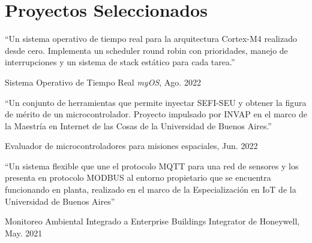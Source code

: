 \section{Proyectos Seleccionados}

\newcommand{\pub}[5]{
	\parbox[t][][t]{\linewidth}{%
		\begin{small}
		\parbox{\linewidth}{{``#4''}}
		\smallbreak
		\parbox{\linewidth}{{#2}, {#1}}
		\parbox{\linewidth}{{\href{https://doi.org/#3}{#3}}}
		\end{small}
	}
	\bigbreak
	\smallskip
}

\pub{Ago. 2022}{Sistema Operativo de Tiempo Real \emph{myOS}}{}{Un sistema operativo de tiempo real para la arquitectura Cortex-M4 realizado desde cero. Implementa un scheduler round robin con prioridades, manejo de interrupciones y un sistema de stack estático para cada tarea.}{
}

\pub{Jun. 2022}{Evaluador de microcontroladores para misiones espaciales}{}{Un conjunto de herramientas que permite inyectar SEFI-SEU y obtener la figura de mérito de un microcontrolador. Proyecto impulsado por INVAP en el marco de la Maestría en Internet de las Cosas de la Universidad de Buenos Aires.}{
}

\pub{May. 2021}{Monitoreo Ambiental Integrado a Enterprise Buildings Integrator de Honeywell}{}{Un sistema flexible que une el protocolo MQTT para una red de sensores y los presenta en protocolo MODBUS al entorno propietario que se encuentra funcionando en planta, realizado en el marco de la Especialización en IoT de la Universidad de Buenos Aires}{
}



